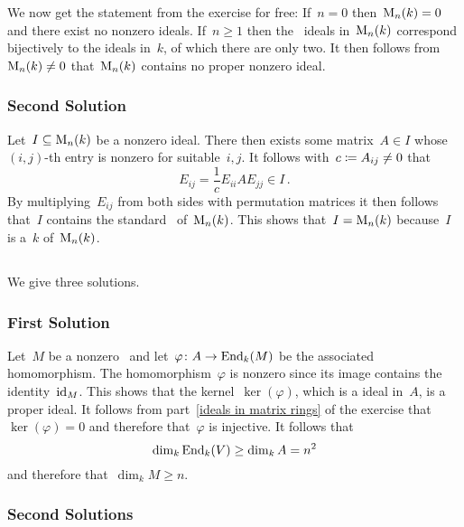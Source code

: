 We now get the statement from the exercise for free:
If~$n = 0$ then~$\operatorname{M}_{n}(k) = 0$ and there exist no nonzero {\twosided} ideals.
If~$n \geq 1$ then the~{\twosided} ideals in~$\operatorname{M}_{n}(k)$ correspond bijectively to the {\twosided} ideals in~$k$, of which there are only two.
It then follows from~$\operatorname{M}_{n}(k) \neq 0$ that~$\operatorname{M}_{n}(k)$ contains no proper nonzero ideal.



\subsubsection{Second Solution}

Let~$I \subseteq \operatorname{M}_{n}(k)$ be a nonzero ideal.
There then exists some matrix~$A \in I$ whose~$(i,j)$-th entry is nonzero for suitable~$i,j$.
It follows with~$c \coloneqq A_{ij} \neq 0$ that
\[
      E_{ij}
  =   \frac{1}{c} E_{ii} A E_{jj}
  \in I \,.
\]
By multiplying~$E_{ij}$ from both sides with permutation matrices it then follows that~$I$ contains the standard~{\kbasis} of~$\operatorname{M}_{n}(k)$.
This shows that~$I = \operatorname{M}_{n}(k)$ because~$I$ is a~$k${\dashsmod} of~$\operatorname{M}_{n}(k)$.





\subsection{}

We give three solutions.



\subsubsection{First Solution}

Let~$M$ be a nonzero~{\Amod} and let~$\varphi \colon A \to  \operatorname{End}_k(M)$ be the associated {\kalg} homomorphism.
The homomorphism~$\varphi$ is nonzero since its image contains the identity~$\operatorname{id}_M$.
This shows that the kernel~$\ker(\varphi)$, which is a {\twosided} ideal in~$A$, is a proper ideal.
It follows from part~\ref{ideals in matrix rings} of the exercise that~$\ker(\varphi) = 0$ and therefore that~$\varphi$ is injective.
It follows that
\[
        \dim_k  \operatorname{End}_k(V)
  \geq  \dim_k  A
  =             n^2
\]
and therefore that~$\dim_k M \geq n$.



\subsubsection{Second Solutions}


